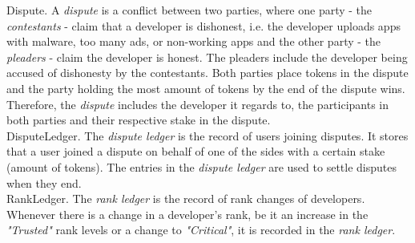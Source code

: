 \noindent \textsf{Dispute}. A \textit{dispute} is a conflict between two parties, where one party - the \textit{contestants} - claim that a developer is dishonest, i.e. the developer uploads apps with malware, too many ads, or non-working apps and the other party - the \textit{pleaders} - claim the developer is honest. The pleaders include the developer being accused of dishonesty by the contestants. Both parties place tokens in the dispute and the party holding the most amount of tokens by the end of the dispute wins. Therefore, the \textit{dispute} includes the developer it regards to, the participants in both parties and their respective stake in the dispute. \\

\noindent \textsf{DisputeLedger}. The \textit{dispute ledger} is the record of users joining disputes. It stores that a user joined a dispute on behalf of one of the sides with a certain stake (amount of tokens). The entries in the \textit{dispute ledger} are used to settle disputes when they end. \\

\noindent \textsf{RankLedger}. The \textit{rank ledger} is the record of rank changes of developers. Whenever there is a change in a developer's rank, be it an increase in the \textit{"Trusted"} rank levels or a change to \textit{"Critical"}, it is recorded in the \textit{rank ledger}.

